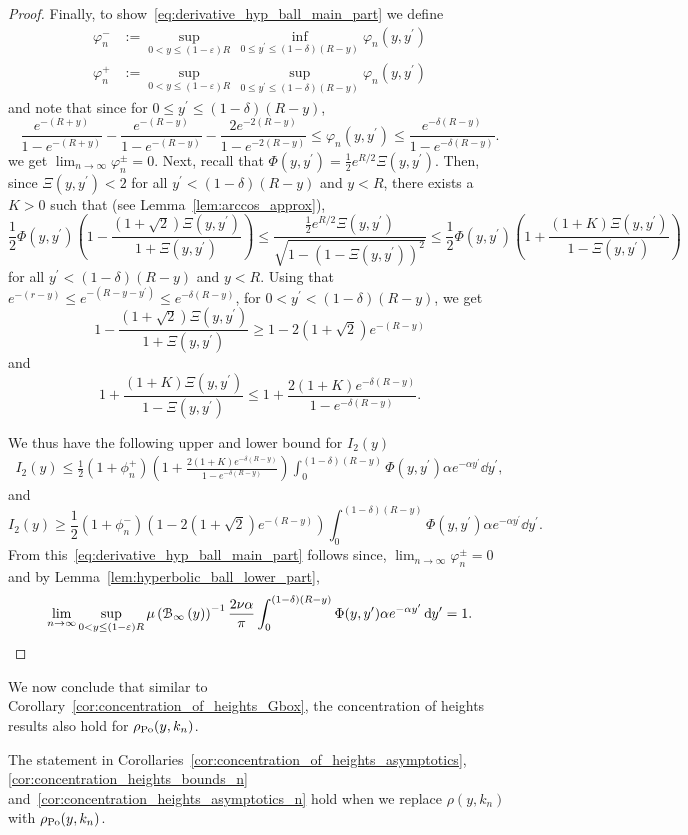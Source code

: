\begin{proof}
Finally, to show~\eqref{eq:derivative_hyp_ball_main_part} we define 
\begin{align*}
	\varphi^-_n &:= \sup_{0 < y \le (1-\varepsilon)R} \, \inf_{0 \le y^\prime \le (1 - \delta)(R-y)} 
		\varphi_n(y,y^\prime)\\
	\varphi^+_n &:= \sup_{0 < y \le (1-\varepsilon)R} \, \sup_{0 \le y^\prime \le (1 - \delta)(R-y)} \varphi_n(y,y^\prime)
\end{align*}
and note that since for $0 \le y^\prime \le (1-\delta)(R-y)$,
\[
	\frac{e^{-(R + y)}}{1 - e^{-(R+y)}} - \frac{e^{-(R- y)}}{1 - e^{-(R-y)}} - \frac{2e^{-2(R-y)}}{1 - e^{-2(R-y)}}
	\le \varphi_n(y,y^\prime) \le \frac{e^{-\delta(R-y)}}{1 - e^{-\delta(R-y)}}.
\] 
we get $\lim_{n \to \infty} \varphi^\pm_n = 0$. Next, recall that $\Phi(y,y^\prime) = \frac{1}{2}e^{R/2}\Xi(y,y^\prime)$. Then, since $\Xi(y,y^\prime) < 2$ for all $y^\prime < (1-\delta)(R-y)$ and $y < R$, there exists a $K > 0$ such that (see Lemma~\ref{lem:arccos_approx}),
\[
	\frac{1}{2}\Phi(y,y^\prime)\left(1 - \frac{(1+\sqrt{2})\Xi(y,y^\prime)}{1 + \Xi(y,y^\prime)}\right)
	\le \frac{\frac{1}{2}e^{R/2} \Xi(y,y^\prime)}{\sqrt{1 - \left(1 - \Xi(y,y^\prime)\right)^2}} 
	\le \frac{1}{2}\Phi(y,y^\prime)\left(1 + \frac{(1+K)\Xi(y,y^\prime)}{1 - \Xi(y,y^\prime)}\right)
\]
for all $y^\prime < (1-\delta)(R - y)$ and $y < R$. Using that $e^{-(r-y)} \le e^{-(R - y - y^\prime)} \le e^{-\delta(R- y)}$, for $0 < y^\prime < (1-\delta)(R-y)$, we get
\[
	1 - \frac{(1+\sqrt{2})\Xi(y,y^\prime)}{1 + \Xi(y,y^\prime)} \ge 1 - 2(1+\sqrt{2})e^{-(R-y)}
\]
and
\[
	1 + \frac{(1+K)\Xi(y,y^\prime)}{1 - \Xi(y,y^\prime)} 
	\le 1 + \frac{2(1 + K)e^{-\delta(R - y)}}{1-e^{-\delta(R-y)}}.
\]

We thus have the following upper and lower bound for $I_2(y)$
\begin{align*}
	I_2(y) \le \frac{1}{2} \left(1 + \phi_n^+\right)
	\left(1 + \frac{2(1 + K)e^{-\delta(R - y)}}{1-e^{-\delta(R-y)}}\right)
	\int_{0}^{(1-\delta)(R-y)} \Phi(y,y^\prime) \alpha e^{-\alpha y^\prime} \dd y^\prime,
\end{align*}
and
\[
	I_2(y) \ge \frac{1}{2} \left(1 + \phi_n^-\right)\left(1 - 2(1+\sqrt{2})e^{-(R-y)}\right)
	\int_{0}^{(1-\delta)(R-y)} \Phi(y,y^\prime) \alpha e^{-\alpha y^\prime} \dd y^\prime.
\]
From this~\eqref{eq:derivative_hyp_ball_main_part} follows since, $\lim_{n \to \infty} \varphi_n^\pm = 0$ and by Lemma~\ref{lem:hyperbolic_ball_lower_part},
\[
	\lim_{n \to \infty} \sup_{0 < y \le (1-\varepsilon)R} \mu\left({\mathcal B}_{\infty}\left(y\right)\right)^{-1} \frac{2\nu \alpha}{\pi} 
	\int_{0}^{(1-\delta)(R-y)} \Phi(y,y^\prime) \alpha e^{-\alpha y^\prime} \operatorname{\mathrm{d}\hspace{-2pt}} y^\prime
	= 1.
\] 
\end{proof}

We now conclude that similar to Corollary~\ref{cor:concentration_of_heights_Gbox}, the concentration of heights results also hold for $\rho_{{\mathrm{Po}}}(y,k_n)$.

\begin{corollary}\label{cor:concentration_of_heights_GPo}
The statement in Corollaries~\ref{cor:concentration_of_heights_asymptotics}, \ref{cor:concentration_heights_bounds_n}
and~\ref{cor:concentration_heights_asymptotics_n} hold when we replace $\rho(y,k_n)$ with $\rho_{{\mathrm{Po}}}(y,k_n)$.
\end{corollary}

